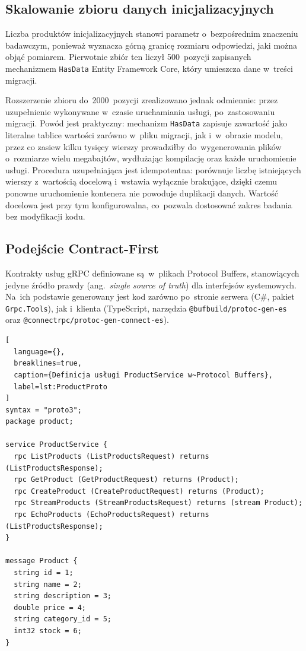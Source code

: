 \subsection{Skalowanie zbioru danych inicjalizacyjnych}
\label{subsec:ZasiewDanych}

Liczba produktów inicjalizacyjnych stanowi parametr o~bezpośrednim znaczeniu badawczym, ponieważ wyznacza górną granicę rozmiaru odpowiedzi, jaki można objąć pomiarem. Pierwotnie zbiór ten liczył 500~pozycji zapisanych mechanizmem \texttt{HasData} Entity Framework Core, który umieszcza dane w~treści migracji.

Rozszerzenie zbioru do~2000~pozycji zrealizowano jednak odmiennie: przez uzupełnienie wykonywane w~czasie uruchamiania usługi, po~zastosowaniu migracji. Powód jest praktyczny: mechanizm \texttt{HasData} zapisuje zawartość jako literalne tablice wartości zarówno w~pliku migracji, jak i~w~obrazie modelu, przez co zasiew kilku tysięcy wierszy prowadziłby do~wygenerowania plików o~rozmiarze wielu megabajtów, wydłużając kompilację oraz każde uruchomienie usługi. Procedura uzupełniająca jest idempotentna: porównuje liczbę istniejących wierszy z~wartością docelową i~wstawia wyłącznie brakujące, dzięki czemu ponowne uruchomienie kontenera nie powoduje duplikacji danych. Wartość docelowa jest przy tym konfigurowalna, co~pozwala dostosować zakres badania bez modyfikacji kodu.

\subsection{Podejście Contract-First}
\label{subsec:ContractFirst}

Kontrakty usług gRPC definiowane są~w~plikach Protocol Buffers, stanowiących jedyne źródło prawdy (ang.\ \textit{single source of truth}) dla interfejsów systemowych. Na~ich podstawie generowany jest kod zarówno po~stronie serwera (C\#, pakiet \texttt{Grpc.Tools}), jak i~klienta (TypeScript, narzędzia \texttt{@bufbuild/protoc-gen-es} oraz \texttt{@connectrpc/protoc-gen-connect-es}).

\begin{lstlisting}[
  language={},
  breaklines=true,
  caption={Definicja usługi ProductService w~Protocol Buffers},
  label=lst:ProductProto
]
syntax = "proto3";
package product;

service ProductService {
  rpc ListProducts (ListProductsRequest) returns (ListProductsResponse);
  rpc GetProduct (GetProductRequest) returns (Product);
  rpc CreateProduct (CreateProductRequest) returns (Product);
  rpc StreamProducts (StreamProductsRequest) returns (stream Product);
  rpc EchoProducts (EchoProductsRequest) returns (ListProductsResponse);
}

message Product {
  string id = 1;
  string name = 2;
  string description = 3;
  double price = 4;
  string category_id = 5;
  int32 stock = 6;
}
\end{lstlisting}

